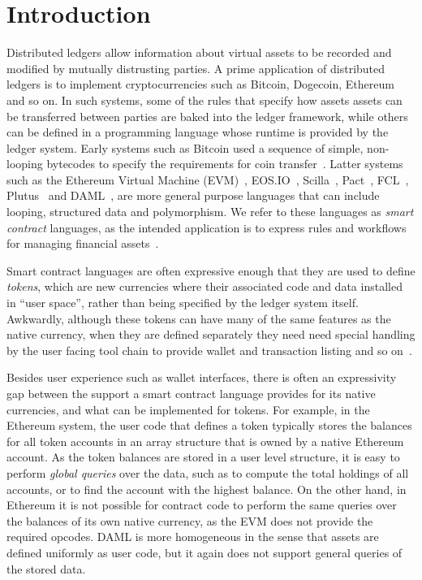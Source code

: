 
\section{Introduction}
Distributed ledgers allow information about virtual assets to be recorded and modified by mutually distrusting parties. A prime application of distributed ledgers is to implement cryptocurrencies such as Bitcoin, Dogecoin, Ethereum and so on. In such systems, some of the rules that specify how assets assets can be transferred between parties are baked into the ledger framework, while others can be defined in a programming language whose runtime is provided by the ledger system. Early systems such as Bitcoin used a sequence of simple, non-looping bytecodes to specify the requirements for coin transfer~\cite{Atzei2017:BitcoinTransactions}. Latter systems such as the Ethereum Virtual Machine (EVM)~\cite{Wood2014:Ethereum}, EOS.IO~\cite{Grigg2017:EosIntroduction}, Scilla~\cite{Sergey2018:Scilla}, Pact~\cite{Popejpy2016:Pact}, FCL~\cite{Adjoint2019:FCL}, Plutus~\cite{IOHK2018:Plutus} and DAML~\cite{DA2019:DAML}, are more general purpose languages that can include looping, structured data and polymorphism. We refer to these languages as \emph{smart contract} languages, as the intended application is to express rules and workflows for managing financial assets~\cite{Harz2018:SurveyLanguages}.

Smart contract languages are often expressive enough that they are used to define \emph{tokens}, which are new currencies where their associated code and data installed in ``user space'', rather than being specified by the ledger system itself. Awkwardly, although these tokens can have many of the same features as the native currency, when they are defined separately they need need special handling by the user facing tool chain to provide wallet and transaction listing and so on~\cite{Vogelsteller2015:ERC20}.

Besides user experience such as wallet interfaces, there is often an expressivity gap between the support a smart contract language provides for its native currencies, and what can be implemented for tokens. For example, in the Ethereum system, the user code that defines a token typically stores  the balances for all token accounts in an array structure that is owned by a native Ethereum account. As the token balances are stored in a user level structure, it is easy to perform \emph{global queries} over the data, such as to compute the total holdings of all accounts, or to find the account with the highest balance. On the other hand, in Ethereum it is not possible for contract code to perform the same queries over the balances of its own native currency, as the EVM does not provide the required opcodes. DAML is more homogeneous in the sense that assets are defined uniformly as user code, but it again does not support general queries of the stored data.


